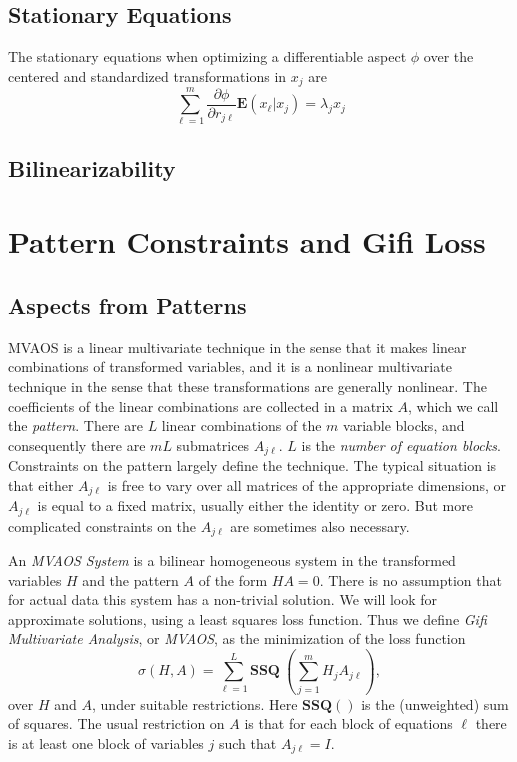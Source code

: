 \documentclass[
  12pt,
]{book}
\begin{document}
\hypertarget{stationary-equations}{%
\section{Stationary Equations}\label{stationary-equations}}

The stationary equations when optimizing a differentiable aspect \(\phi\) over the centered and standardized transformations in \(x_j\) are
\[
\sum_{\ell=1}^m \frac{\partial\phi}{\partial r_{j\ell}}\mathbf{E}(x_\ell|x_j)=\lambda_jx_j
\]

\hypertarget{bilinearizability}{%
\section{Bilinearizability}\label{bilinearizability}}

\hypertarget{pattern-constraints-and-gifi-loss}{%
\chapter{Pattern Constraints and Gifi Loss}\label{pattern-constraints-and-gifi-loss}}

\hypertarget{aspects-from-patterns}{%
\section{Aspects from Patterns}\label{aspects-from-patterns}}

MVAOS is a linear multivariate technique in the sense that it makes linear combinations of transformed variables, and it is a nonlinear multivariate technique in the sense that these transformations are generally nonlinear. The coefficients of the linear combinations are collected in a matrix \(A\), which we call the \emph{pattern}. There are \(L\) linear combinations of the \(m\) variable blocks, and consequently there are \(mL\) submatrices \(A_{j\ell}\). \(L\) is the \emph{number of equation blocks}. Constraints on the pattern largely define the technique. The typical situation is that either \(A_{j\ell}\) is free to vary over all matrices of the appropriate dimensions, or \(A_{j\ell}\) is equal to a fixed matrix, usually either the identity or zero. But more complicated constraints on the \(A_{j\ell}\) are sometimes also necessary.

An \emph{MVAOS System} is a bilinear homogeneous system in the transformed variables \(H\) and the pattern \(A\) of the form \(HA=0\).
There is no assumption that for actual data this system has a non-trivial solution. We will look for approximate solutions, using a least squares loss function. Thus we define \emph{Gifi Multivariate Analysis}, or \emph{MVAOS}, as the minimization of the loss function
\begin{equation}
\sigma(H,A)=\sum_{\ell=1}^L\mathbf{SSQ}\ (\sum_{j=1}^m H_jA_{j\ell}),\label{E:newloss}
\end{equation}
over \(H\) and \(A\), under suitable restrictions. Here \(\mathbf{SSQ}()\) is the (unweighted) sum of squares. The usual restriction on \(A\) is that for each block of equations \(\ell\) there is at least one block of variables \(j\) such that \(A_{j\ell}=I\).
\end{document}
